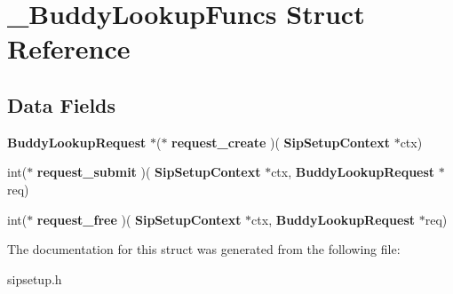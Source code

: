 \section{\+\_\+\+Buddy\+Lookup\+Funcs Struct Reference}
\label{struct__BuddyLookupFuncs}
\subsection*{Data Fields}
\begin{DoxyCompactItemize}
\item 
\mbox{\label{struct__BuddyLookupFuncs_a93d6c9c04a13545f2c563647bcec6e73}} 
\textbf{ Buddy\+Lookup\+Request} $\ast$($\ast$ {\bfseries request\+\_\+create} )(\textbf{ Sip\+Setup\+Context} $\ast$ctx)
\item 
\mbox{\label{struct__BuddyLookupFuncs_a054d7ee9dff3ff04086daf1a1c11ef48}} 
int($\ast$ {\bfseries request\+\_\+submit} )(\textbf{ Sip\+Setup\+Context} $\ast$ctx, \textbf{ Buddy\+Lookup\+Request} $\ast$req)
\item 
\mbox{\label{struct__BuddyLookupFuncs_ad164f3981dc588309a0e9197d028c12a}} 
int($\ast$ {\bfseries request\+\_\+free} )(\textbf{ Sip\+Setup\+Context} $\ast$ctx, \textbf{ Buddy\+Lookup\+Request} $\ast$req)
\end{DoxyCompactItemize}


The documentation for this struct was generated from the following file\+:\begin{DoxyCompactItemize}
\item 
sipsetup.\+h\end{DoxyCompactItemize}
